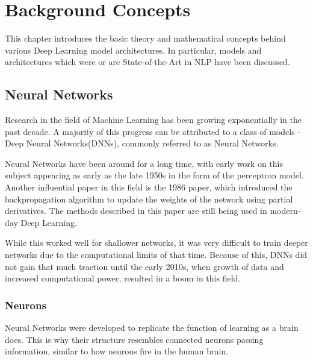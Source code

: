 
\chapter{Background Concepts} %

\label{Chapter2} %


This chapter introduces the basic theory and mathematical concepts behind various Deep Learning model architectures. In particular, models and architectures which were or are State-of-the-Art in NLP have been discussed. 

\section{Neural Networks}

Research in the field of Machine Learning has been growing exponentially in the past decade. A majority of this progress can be attributed to a class of models - Deep Neural Networks(DNNs), commonly referred to as Neural Networks.

Neural Networks have been around for a long time, with early work on this subject appearing as early as the late 1950s in the form of the perceptron model\cite{Rosenblatt1958ThePA}. Another influential paper in this field is the 1986 paper, which introduced the backpropagation algorithm to update the weights of the network using partial derivatives\cite{Rumelhart1986LearningRB}. The methods described in this paper are still being used in modern-day Deep Learning.

While this worked well for shallower networks, it was very difficult to train deeper networks due to the computational limits of that time. Because of this, DNNs did not gain that much traction until the early 2010s, when growth of data and increased computational power, resulted in a boom in this field. 


\subsection{Neurons}

Neural Networks were developed to replicate the function of learning as a brain does. This is why their structure resembles connected neurons passing information, similar to how neurons fire in the human brain.

